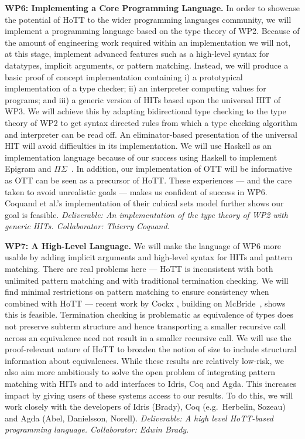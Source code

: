 \documentclass[a4paper,11pt]{article}
\newcommand{\eg}{{e.g.}\ }
\begin{document}
{\bf WP6: Implementing a Core Programming Language.} In order to
showcase the potential of HoTT to the wider programming languages
community, we will implement a programming language based on the type
theory of WP2.  Because of the amount of engineering work required
within an implementation we will not, at this stage, implement
advanced features such as a high-level syntax for datatypes, implicit
arguments, or pattern matching. Instead, we will produce a basic proof
of concept implementation containing i) a prototypical implementation
of a type checker; ii) an interpreter computing values for programs;
and iii) a generic version of HITs based upon the universal HIT of
WP3. We will achieve this by adapting bidirectional type checking to
the type theory of WP2 to get syntax directed rules from which a type
checking algorithm and interpreter can be read off. An
eliminator-based presentation of the universal HIT will
avoid difficulties in its implementation. We will use Haskell as an
implementation language because of our 
success using Haskell to implement Epigram and
$\Pi\Sigma$~\cite{alti:checking,easy,alti:pisigma-new}. In addition,
our implementation of OTT will be informative as OTT can be seen as a
precursor of HoTT.  These experiences --- and the care taken to avoid
unrealistic goals --- makes us confident of success in
WP6. Coquand et al.'s implementation of their cubical sets
model further shows our goal is feasible. {\em Deliverable: An
  implementation of the type theory of WP2 with generic HITs.  Collaborator: Thierry Coquand.
}


{\bf WP7: A High-Level Language.} We will make the
language of WP6 more usable by adding implicit arguments and
high-level syntax for HITs and pattern matching. There are real
problems here --- HoTT is inconsistent with both unlimited pattern
matching and with traditional termination checking. We will find
minimal restrictions on pattern matching to ensure consistency when
combined with HoTT --- recent work by Cockx \cite{cockx-without-k},
building on McBride~\cite{viewftl}, shows this is
feasible. Termination checking is problematic as equivalence of types
does not preserve subterm structure and hence transporting a smaller
recursive call across an equivalence need not result in a smaller
recursive call. We will use the proof-relevant nature of HoTT to
broaden the notion of size to include structural information about
equivalences. While these results are relatively low-risk, we also aim
more ambitiously to solve the open problem of integrating pattern
matching with HITs and to add interfaces to Idris, Coq and Agda. This
increases impact by giving users of these systems access to our
results. To do this, we will work closely with the developers of Idris
(Brady), Coq (\eg Herbelin, Sozeau) and Agda (Abel, Danielsson, Norell). {\em
  Deliverable: A high level HoTT-based programming language.
  Collaborator: Edwin Brady.  }
\end{document}
